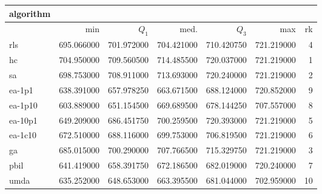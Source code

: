 \begin{tabular}{@{}l*{5}{>{{}}N{3}{2}}>{{}}N{2}{0}@{}}
\toprule
{algorithm} &  \\
\midrule
& {min} & {$Q_1$} & {med.} & {$Q_3$} & {max} & {rk}\\
\midrule
rls & 695.066000 & 701.972000 & 704.421000 & 710.420750 & {\color{blue}} 721.219000 & 4\\
hc & {\color{blue}} 704.950000 & {\color{blue}} 709.560500 & {\color{blue}} 714.485500 & 720.037000 & {\color{blue}} 721.219000 & 1\\
sa & 698.753000 & 708.911000 & 713.693000 & 720.240000 & {\color{blue}} 721.219000 & 2\\
ea-1p1 & 638.391000 & 657.978250 & 663.671500 & 688.124000 & 720.852000 & 9\\
ea-1p10 & 603.889000 & 651.154500 & 669.689500 & 678.144250 & 707.557000 & 8\\
ea-10p1 & 649.209000 & 686.451750 & 700.259500 & {\color{blue}} 720.393000 & {\color{blue}} 721.219000 & 5\\
ea-1c10 & 672.510000 & 688.116000 & 699.753000 & 706.819500 & {\color{blue}} 721.219000 & 6\\
ga & 685.015000 & 700.290000 & 707.766500 & 715.329750 & {\color{blue}} 721.219000 & 3\\
pbil & 641.419000 & 658.391750 & 672.186500 & 682.019000 & 720.240000 & 7\\
umda & 635.252000 & 648.653000 & 663.395500 & 681.044000 & 702.959000 & 10\\
\bottomrule
\end{tabular}
